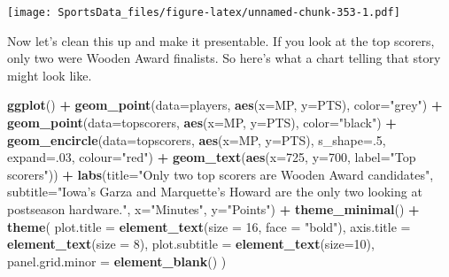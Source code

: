 \documentclass[
]{book}
\newenvironment{Shaded}{\begin{snugshade}}{\end{snugshade}}
\newcommand{\DataTypeTok}[1]{\textcolor[rgb]{0.13,0.29,0.53}{#1}}
\newcommand{\DecValTok}[1]{\textcolor[rgb]{0.00,0.00,0.81}{#1}}
\newcommand{\KeywordTok}[1]{\textcolor[rgb]{0.13,0.29,0.53}{\textbf{#1}}}
\newcommand{\NormalTok}[1]{#1}
\newcommand{\OperatorTok}[1]{\textcolor[rgb]{0.81,0.36,0.00}{\textbf{#1}}}
\newcommand{\StringTok}[1]{\textcolor[rgb]{0.31,0.60,0.02}{#1}}
\begin{document}
\texttt{[image: SportsData\_files/figure-latex/unnamed-chunk-353-1.pdf]}

Now let's clean this up and make it presentable. If you look at the top scorers, only two were Wooden Award finalists. So here's what a chart telling that story might look like.

\begin{Shaded}
\begin{Highlighting}[]
\KeywordTok{ggplot}\NormalTok{() }\OperatorTok{+}\StringTok{ }
\StringTok{  }\KeywordTok{geom_point}\NormalTok{(}\DataTypeTok{data=}\NormalTok{players, }\KeywordTok{aes}\NormalTok{(}\DataTypeTok{x=}\NormalTok{MP, }\DataTypeTok{y=}\NormalTok{PTS), }\DataTypeTok{color=}\StringTok{"grey"}\NormalTok{) }\OperatorTok{+}\StringTok{ }
\StringTok{  }\KeywordTok{geom_point}\NormalTok{(}\DataTypeTok{data=}\NormalTok{topscorers, }\KeywordTok{aes}\NormalTok{(}\DataTypeTok{x=}\NormalTok{MP, }\DataTypeTok{y=}\NormalTok{PTS), }\DataTypeTok{color=}\StringTok{"black"}\NormalTok{) }\OperatorTok{+}\StringTok{ }
\StringTok{  }\KeywordTok{geom_encircle}\NormalTok{(}\DataTypeTok{data=}\NormalTok{topscorers, }\KeywordTok{aes}\NormalTok{(}\DataTypeTok{x=}\NormalTok{MP, }\DataTypeTok{y=}\NormalTok{PTS), }\DataTypeTok{s_shape=}\NormalTok{.}\DecValTok{5}\NormalTok{, }\DataTypeTok{expand=}\NormalTok{.}\DecValTok{03}\NormalTok{, }\DataTypeTok{colour=}\StringTok{"red"}\NormalTok{) }\OperatorTok{+}
\StringTok{  }\KeywordTok{geom_text}\NormalTok{(}\KeywordTok{aes}\NormalTok{(}\DataTypeTok{x=}\DecValTok{725}\NormalTok{, }\DataTypeTok{y=}\DecValTok{700}\NormalTok{, }\DataTypeTok{label=}\StringTok{"Top scorers"}\NormalTok{)) }\OperatorTok{+}\StringTok{ }
\StringTok{  }\KeywordTok{labs}\NormalTok{(}\DataTypeTok{title=}\StringTok{"Only two top scorers are Wooden Award candidates"}\NormalTok{, }\DataTypeTok{subtitle=}\StringTok{"Iowa's Garza and Marquette's Howard are the only two looking at postseason hardware."}\NormalTok{, }\DataTypeTok{x=}\StringTok{"Minutes"}\NormalTok{, }\DataTypeTok{y=}\StringTok{"Points"}\NormalTok{) }\OperatorTok{+}\StringTok{ }
\StringTok{  }\KeywordTok{theme_minimal}\NormalTok{() }\OperatorTok{+}\StringTok{ }
\StringTok{  }\KeywordTok{theme}\NormalTok{(}
    \DataTypeTok{plot.title =} \KeywordTok{element_text}\NormalTok{(}\DataTypeTok{size =} \DecValTok{16}\NormalTok{, }\DataTypeTok{face =} \StringTok{"bold"}\NormalTok{),}
    \DataTypeTok{axis.title =} \KeywordTok{element_text}\NormalTok{(}\DataTypeTok{size =} \DecValTok{8}\NormalTok{), }
    \DataTypeTok{plot.subtitle =} \KeywordTok{element_text}\NormalTok{(}\DataTypeTok{size=}\DecValTok{10}\NormalTok{), }
    \DataTypeTok{panel.grid.minor =} \KeywordTok{element_blank}\NormalTok{()}
\NormalTok{    )}
\end{Highlighting}
\end{Shaded}
\end{document}
